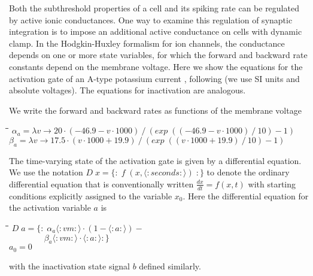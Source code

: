 \documentclass[11pt]{article}
\newlength{\lwidth}\setlength{\lwidth}{4.5cm}
\newlength{\cwidth}\setlength{\cwidth}{8mm} %
\newcommand{\Conid}[1]{\mathit{#1}}
\newcommand{\Varid}[1]{\mathit{#1}}
\begin{document}
Both the subthreshold properties of a cell and its spiking rate can be
regulated by active ionic conductances. One way to examine this
regulation of synaptic integration is to impose an additional active
conductance on cells with dynamic clamp. In the Hodgkin-Huxley
formalism for ion channels, the conductance depends on one or more
state variables, for which the forward and backward rate constants
depend on the membrane voltage. Here we show the equations for the
activation gate of an A-type potassium current \cite{Connor1971},
following \cite{Traub1991} (we use SI units and absolute voltages). The
equations for inactivation are analogous.

We write the forward and backward rates as functions of the membrane voltage
\begin{tabbing}
\qquad\=\hspace{\lwidth}\=\hspace{\cwidth}\=\+\kill
${\alpha_a\mathrel{=}\lambda \Varid{v}\to \mathrm{20}\!\cdot\!(\mathbin{-}\mathrm{46.9}\mathbin{-}\Varid{v}\!\cdot\!\mathrm{1000})\mathbin{/}(\Varid{exp}\;((\mathbin{-}\mathrm{46.9}\mathbin{-}\Varid{v}\!\cdot\!\mathrm{1000})\mathbin{/}\mathrm{10})\mathbin{-}\mathrm{1})}$\\
${\beta_a\mathrel{=}\lambda \Varid{v}\to \mathrm{17.5}\!\cdot\!(\Varid{v}\!\cdot\!\mathrm{1000}\mathbin{+}\mathrm{19.9})\mathbin{/}(\Varid{exp}\;((\Varid{v}\!\cdot\!\mathrm{1000}\mathbin{+}\mathrm{19.9})\mathbin{/}\mathrm{10})\mathbin{-}\mathrm{1})}$
\end{tabbing}
The time-varying state of the activation gate is given by a
differential equation. We use the notation \ensuremath{\Conid{D}\;\Varid{x}\mathrel{=}\{\!:\!\;\Varid{f}\;(\Varid{x},\langle:\Varid{seconds}:\rangle)\;\!:\!\}} to denote the ordinary differential equation
that is conventionally written $\frac{dx}{dt} = f(x,t) $ with starting
conditions explicitly assigned to the variable $x_0$. Here the
differential equation for the activation variable $a$ is
\begin{tabbing}
\qquad\=\hspace{\lwidth}\=\hspace{\cwidth}\=\+\kill
${\Conid{D}\;\Varid{a}\mathrel{=}\{\!:\!\;\alpha_a\langle:\Varid{vm}:\rangle\!\cdot\!(\mathrm{1}\mathbin{-}\langle:\Varid{a}:\rangle)\mathbin{-}}$\\
${\phantom{\Conid{D}\;\Varid{a}\mathrel{=}\{\!:\!\;\mbox{}}\beta_a\langle:\Varid{vm}:\rangle\!\cdot\!\langle:\Varid{a}:\rangle\!:\!\}}$\\
${a_0\mathrel{=}\mathrm{0}}$
\end{tabbing}with the inactivation state signal \ensuremath{\Varid{b}} defined similarly.
\end{document}

